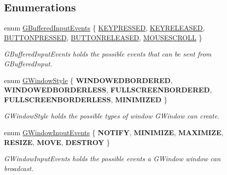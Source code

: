 \subsection*{Enumerations}
\begin{DoxyCompactItemize}
\item 
enum \mbox{\hyperlink{namespaceGW_1_1SYSTEM_a309fd3a92512dd2bfa8065d99c0d7fcb}{G\+Buffered\+Input\+Events}} \{ \newline
\mbox{\hyperlink{namespaceGW_1_1SYSTEM_a309fd3a92512dd2bfa8065d99c0d7fcbaf8bb58b0791c2d5d33b224213327f960}{K\+E\+Y\+P\+R\+E\+S\+S\+ED}}, 
\mbox{\hyperlink{namespaceGW_1_1SYSTEM_a309fd3a92512dd2bfa8065d99c0d7fcbabb708a216e7e8ef33cc542e6def7a688}{K\+E\+Y\+R\+E\+L\+E\+A\+S\+ED}}, 
\mbox{\hyperlink{namespaceGW_1_1SYSTEM_a309fd3a92512dd2bfa8065d99c0d7fcba56314f1a5b4d09751ed354a45a3a78fb}{B\+U\+T\+T\+O\+N\+P\+R\+E\+S\+S\+ED}}, 
\mbox{\hyperlink{namespaceGW_1_1SYSTEM_a309fd3a92512dd2bfa8065d99c0d7fcba9f7d6e613de276b27e471cd30eac08de}{B\+U\+T\+T\+O\+N\+R\+E\+L\+E\+A\+S\+ED}}, 
\newline
\mbox{\hyperlink{namespaceGW_1_1SYSTEM_a309fd3a92512dd2bfa8065d99c0d7fcbae4066728a571d6456cf5def5742a92bf}{M\+O\+U\+S\+E\+S\+C\+R\+O\+LL}}
 \}
\begin{DoxyCompactList}\small\item\em G\+Buffered\+Input\+Events holds the possible events that can be sent from G\+Buffered\+Input. \end{DoxyCompactList}\item 
\mbox{\label{namespaceGW_1_1SYSTEM_ad117891e556631f842625c348d36a071}} 
enum \mbox{\hyperlink{namespaceGW_1_1SYSTEM_ad117891e556631f842625c348d36a071}{G\+Window\+Style}} \{ \newline
{\bfseries W\+I\+N\+D\+O\+W\+E\+D\+B\+O\+R\+D\+E\+R\+ED}, 
{\bfseries W\+I\+N\+D\+O\+W\+E\+D\+B\+O\+R\+D\+E\+R\+L\+E\+SS}, 
{\bfseries F\+U\+L\+L\+S\+C\+R\+E\+E\+N\+B\+O\+R\+D\+E\+R\+ED}, 
{\bfseries F\+U\+L\+L\+S\+C\+R\+E\+E\+N\+B\+O\+R\+D\+E\+R\+L\+E\+SS}, 
\newline
{\bfseries M\+I\+N\+I\+M\+I\+Z\+ED}
 \}
\begin{DoxyCompactList}\small\item\em G\+Window\+Style holds the possible types of window G\+Window can create. \end{DoxyCompactList}\item 
\mbox{\label{namespaceGW_1_1SYSTEM_a7d3a00c7f94541cb6f446fde944ab309}} 
enum \mbox{\hyperlink{namespaceGW_1_1SYSTEM_a7d3a00c7f94541cb6f446fde944ab309}{G\+Window\+Input\+Events}} \{ \newline
{\bfseries N\+O\+T\+I\+FY}, 
{\bfseries M\+I\+N\+I\+M\+I\+ZE}, 
{\bfseries M\+A\+X\+I\+M\+I\+ZE}, 
{\bfseries R\+E\+S\+I\+ZE}, 
\newline
{\bfseries M\+O\+VE}, 
{\bfseries D\+E\+S\+T\+R\+OY}
 \}
\begin{DoxyCompactList}\small\item\em G\+Window\+Input\+Events holds the possible events a G\+Window window can broadcast. \end{DoxyCompactList}\end{DoxyCompactItemize}

